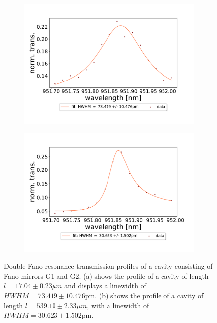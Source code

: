 \begin{figure}[h!]
    \centering
    \begin{subfigure}[b]{0.49\textwidth}
        \centering
        \includegraphics[width=\textwidth]{figures/results/double fano fits/30um_M3:M5_fit_4.pdf}
        \caption{}
        \label{fig:short_double_fano_trans}
    \end{subfigure}
    \begin{subfigure}[b]{0.49\textwidth}
        \centering
        \includegraphics[width=\textwidth]{figures/results/double fano fits/550um_M3:M5_fit_1.pdf}
        \caption{}
        \label{fig:long_double_fano_trans}
    \end{subfigure}
    \caption{Double Fano resonance transmission profiles of a cavity consisting of Fano mirrors G1 and G2. (a) shows the profile of a cavity of length $l = 17.04 \pm 0.23 \mu m$ and displays a linewidth of $HWHM = 73.419 \pm 10.476$pm. (b) shows the profile of a cavity of length $l = 539.10 \pm 2.33 \mu m$, with a linewidth of $HWHM = 30.623 \pm 1.502$pm.}
    \label{fig:double_fano_trans_data}
\end{figure}

